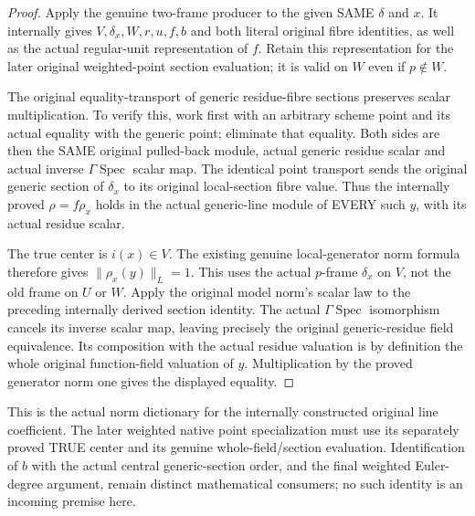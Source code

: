 \begin{proof}
Apply the genuine two-frame producer to the given SAME $\delta$ and $x$.
It internally gives $V,\delta_x,W,r,u,f,b$ and both literal original fibre
identities, as well as the actual regular-unit representation of $f$.
Retain this representation for the later original weighted-point section
evaluation; it is valid on $W$ even if $p\notin W$.

The original equality-transport of generic residue-fibre sections preserves
scalar multiplication. To verify this, work first with an arbitrary scheme
point and its actual equality with the generic point; eliminate that equality.
Both sides are then the SAME original pulled-back module, actual generic
residue scalar and actual inverse $\Gamma\operatorname{Spec}$ scalar map.
The identical point transport sends the original generic section of
$\delta_x$ to its original local-section fibre value. Thus the internally
proved $\rho=f\rho_x$ holds in the actual generic-line module of EVERY such
$y$, with its actual residue scalar.

The true center is $i(x)\in V$. The existing genuine local-generator norm
formula therefore gives $\|\rho_x(y)\|_L=1$. This uses the actual
$p$-frame $\delta_x$ on $V$, not the old frame on $U$ or $W$. Apply the
original model norm's scalar law to the preceding internally derived
section identity. The actual $\Gamma\operatorname{Spec}$ isomorphism cancels
its inverse scalar map, leaving precisely the original generic-residue
field equivalence. Its composition with the actual residue valuation is
by definition the whole original function-field valuation of $y$.
Multiplication by the proved generator norm one gives the displayed equality.
\end{proof}

This is the actual norm dictionary for the internally constructed original
line coefficient. The later weighted native point specialization must use
its separately proved TRUE center and its genuine whole-field/section
evaluation. Identification of $b$ with the actual central generic-section
order, and the final weighted Euler-degree argument, remain distinct
mathematical consumers; no such identity is an incoming premise here.
